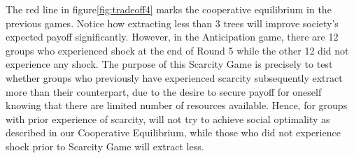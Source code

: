 \noindent The red line in figure\ref{fig:tradeoff4} marks the cooperative equilibrium in the previous games. Notice how extracting less than 3 trees will improve society's expected payoff significantly. However, in the Anticipation game, there are 12 groups who experienced shock at the end of Round 5 while the other 12 did not experience any shock. The purpose of this Scarcity Game is precisely to test whether groups who previously have experienced scarcity subsequently extract more than their counterpart, due to the desire to secure payoff for oneself knowing that there are limited number of resources available. Hence, for groups with prior experience of scarcity, will not try to achieve social optimality as described in our Cooperative Equilibrium, while those who did not experience shock prior to Scarcity Game will extract less.
